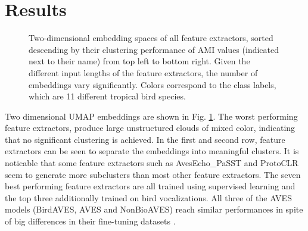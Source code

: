 \section{Results}
\label{sec:results}

\begin{figure}[ht]
    \centerline{}
    \caption{Two-dimensional embedding spaces of all feature extractors, sorted descending by their clustering performance of AMI values (indicated next to their name) from top left to bottom right.
    Given the different input lengths of the feature extractors, the number of embeddings vary significantly.
    Colors correspond to the class labels, which are 11 different tropical bird species.}
    \label{fig:embeds}
\end{figure}


Two dimensional UMAP embeddings are shown in Fig. \ref{fig:embeds}.
The worst performing feature extractors, produce large unstructured clouds of mixed color, indicating that no significant clustering is achieved.
In the first and second row, feature extractors can be seen to separate the embeddings into meaningful clusters.
It is noticable that some feature extractors such as AvesEcho\_PaSST and ProtoCLR seem to generate more subclusters than most other feature extractors.
The seven best performing feature extractors are all trained using supervised learning and the top three additionally trained on bird vocalizations.
All three of the AVES models (BirdAVES, AVES and NonBioAVES) reach similar performances in spite of big differences in their fine-tuning datasets \cite{hagiwara_aves_2022}.

